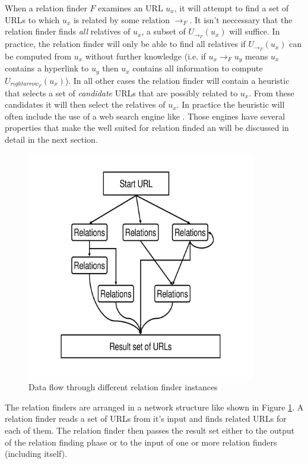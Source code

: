 \documentclass[a4paper]{danarticle}
\theoremstyle{remark}
\begin{document}
       When a relation finder $ F $ examines an URL $ u_x $, it will attempt to 
       find a set of URLs to which $ u_x $ is related by some relation 
       $ \rightarrow_F $. It isn't neccessary that the relation finder finds 
       \emph{all} relatives of $ u_x $, a subset of $ U_{\rightarrow_F}(u_x) $ 
       will suffice. In practice, the relation finder will only be able to find 
       all relatives if $ U_{\rightarrow_F}(u_x) $ can be computed from $ u_x $ 
       without further knowledge (i.e. if $ u_x \rightarrow_F u_y $ means 
       $ u_x $ contains a hyperlink to $ u_y $ then $ u_x $ contains all 
       information to compute $ U_{rightarrow_F}(u_x) $). In all other cases the 
       relation finder will contain a heuristic that selects a set of 
       \textit{candidate} URLs that are possibly related to $ u_x $. From these 
       candidates it will then select the relatives of $ u_x $. In practice the 
       heuristic will often include the use of a web search engine like 
       \cite{google}. Those engines have several properties that make the well 
       suited for relation finded an will be discussed in detail in the next 
       section.
       \begin{figure}[ht]
         \centering
	     \includegraphics[width=10cm]{relations}
	     \caption{Data flow through different relation finder instances}
	     \label{relations}
       \end{figure}
       The relation finders are arranged in a network structure like shown in 
       Figure \ref{relations}. A relation finder reads a set of URLs from it's 
       input and finds related URLs for each of them. The relation 
       finder then passes the result set either to the output of the relation 
       finding phase or to the input of one or more relation finders (including 
       itself).
       
\end{document}
